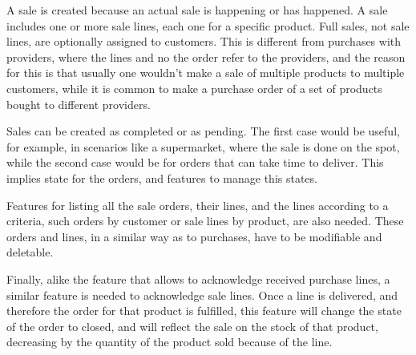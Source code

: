 A sale is created because an actual sale is happening or has happened. A sale includes one or more sale lines, each one for a specific product. Full sales, not sale lines, are optionally assigned to customers. This is different from purchases with providers, where the lines and no the order refer to the providers, and the reason for this is that usually one wouldn’t make a sale of multiple products to multiple customers, while it is common to make a purchase order of a set of products bought to different providers.

Sales can be created as completed or as pending. The first case would be useful, for example, in scenarios like a supermarket, where the sale is done on the spot, while the second case would be for orders that can take time to deliver. This implies state for the orders, and features to manage this states.

Features for listing all the sale orders, their lines, and the lines according to a criteria, such orders by customer or sale lines by product, are also needed. These orders and lines, in a similar way as to purchases, have to be modifiable and deletable.

Finally, alike the feature that allows to acknowledge received purchase lines, a similar feature is needed to acknowledge sale lines. Once a line is delivered, and therefore the order for that product is fulfilled, this feature will change the state of the order to closed, and will reflect the sale on the stock of that product, decreasing by the quantity of the product sold because of the line.

